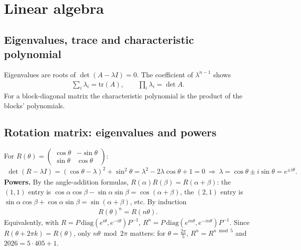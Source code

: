\section{Linear algebra}

\subsection{Eigenvalues, trace and characteristic polynomial}
Eigenvalues are roots of $\det(A-\lambda I)=0$. The coefficient of $\lambda^{n-1}$ shows
\begin{align}
\sum_i\lambda_i=\mathrm{tr}(A),\qquad \prod_i\lambda_i=\det A. \label{eq:trace}
\end{align}
For a block-diagonal matrix the characteristic polynomial is the product of the blocks' polynomials.

\subsection{Rotation matrix: eigenvalues and powers}
For $R(\theta)=\begin{pmatrix}\cos\theta&-\sin\theta\\ \sin\theta&\cos\theta\end{pmatrix}$:
\begin{align}
\det(R-\lambda I)=(\cos\theta-\lambda)^2+\sin^2\theta=\lambda^2-2\lambda\cos\theta+1=0
\ \Rightarrow\ \lambda=\cos\theta\pm i\sin\theta=e^{\pm i\theta}. \label{eq:roteig}
\end{align}
\textbf{Powers.} By the angle-addition formulas, $R(\alpha)R(\beta)=R(\alpha+\beta)$:
the $(1,1)$ entry is $\cos\alpha\cos\beta-\sin\alpha\sin\beta=\cos(\alpha+\beta)$, the $(2,1)$ entry is
$\sin\alpha\cos\beta+\cos\alpha\sin\beta=\sin(\alpha+\beta)$, etc. By induction
\begin{align}
R(\theta)^n=R(n\theta). \label{eq:rotpow}
\end{align}
Equivalently, with $R=P\,\mathrm{diag}(e^{i\theta},e^{-i\theta})P^{-1}$, $R^n=P\,\mathrm{diag}(e^{in\theta},e^{-in\theta})P^{-1}$.
Since $R(\theta+2\pi k)=R(\theta)$, only $n\theta \bmod 2\pi$ matters: for $\theta=\frac{2\pi}{5}$,
$R^{n}=R^{n \bmod 5}$ and $2026=5\cdot405+1$.

